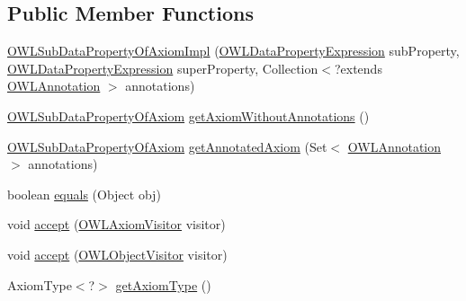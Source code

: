 \subsection*{Public Member Functions}
\begin{DoxyCompactItemize}
\item 
\hyperlink{classuk_1_1ac_1_1manchester_1_1cs_1_1owl_1_1owlapi_1_1_o_w_l_sub_data_property_of_axiom_impl_a3b240bc09013c2e0c4d241b06abd0ebc}{O\-W\-L\-Sub\-Data\-Property\-Of\-Axiom\-Impl} (\hyperlink{interfaceorg_1_1semanticweb_1_1owlapi_1_1model_1_1_o_w_l_data_property_expression}{O\-W\-L\-Data\-Property\-Expression} sub\-Property, \hyperlink{interfaceorg_1_1semanticweb_1_1owlapi_1_1model_1_1_o_w_l_data_property_expression}{O\-W\-L\-Data\-Property\-Expression} super\-Property, Collection$<$?extends \hyperlink{interfaceorg_1_1semanticweb_1_1owlapi_1_1model_1_1_o_w_l_annotation}{O\-W\-L\-Annotation} $>$ annotations)
\item 
\hyperlink{interfaceorg_1_1semanticweb_1_1owlapi_1_1model_1_1_o_w_l_sub_data_property_of_axiom}{O\-W\-L\-Sub\-Data\-Property\-Of\-Axiom} \hyperlink{classuk_1_1ac_1_1manchester_1_1cs_1_1owl_1_1owlapi_1_1_o_w_l_sub_data_property_of_axiom_impl_a4cd4b514adc785f18293ca0459c9b1a8}{get\-Axiom\-Without\-Annotations} ()
\item 
\hyperlink{interfaceorg_1_1semanticweb_1_1owlapi_1_1model_1_1_o_w_l_sub_data_property_of_axiom}{O\-W\-L\-Sub\-Data\-Property\-Of\-Axiom} \hyperlink{classuk_1_1ac_1_1manchester_1_1cs_1_1owl_1_1owlapi_1_1_o_w_l_sub_data_property_of_axiom_impl_a3bb06f304e7eeaa7a38482be5c09f0b3}{get\-Annotated\-Axiom} (Set$<$ \hyperlink{interfaceorg_1_1semanticweb_1_1owlapi_1_1model_1_1_o_w_l_annotation}{O\-W\-L\-Annotation} $>$ annotations)
\item 
boolean \hyperlink{classuk_1_1ac_1_1manchester_1_1cs_1_1owl_1_1owlapi_1_1_o_w_l_sub_data_property_of_axiom_impl_a771c8fcda0bb2a99cf471a1930475b02}{equals} (Object obj)
\item 
void \hyperlink{classuk_1_1ac_1_1manchester_1_1cs_1_1owl_1_1owlapi_1_1_o_w_l_sub_data_property_of_axiom_impl_a96f1438f93e93b810c4ae4da05aea3ca}{accept} (\hyperlink{interfaceorg_1_1semanticweb_1_1owlapi_1_1model_1_1_o_w_l_axiom_visitor}{O\-W\-L\-Axiom\-Visitor} visitor)
\item 
void \hyperlink{classuk_1_1ac_1_1manchester_1_1cs_1_1owl_1_1owlapi_1_1_o_w_l_sub_data_property_of_axiom_impl_aa879149dc0f4550b946d552a6a2e66f5}{accept} (\hyperlink{interfaceorg_1_1semanticweb_1_1owlapi_1_1model_1_1_o_w_l_object_visitor}{O\-W\-L\-Object\-Visitor} visitor)
\item 
Axiom\-Type$<$?$>$ \hyperlink{classuk_1_1ac_1_1manchester_1_1cs_1_1owl_1_1owlapi_1_1_o_w_l_sub_data_property_of_axiom_impl_a9797aa8fb8e33c840258c2f8a2cddd09}{get\-Axiom\-Type} ()
\end{DoxyCompactItemize}
